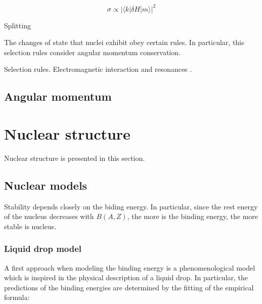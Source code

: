 \documentclass[openany]{book}
\begin{document}
\begin{equation} \label{eq:crossSection_perturbation}
	\sigma \propto |\langle k | \delta H|m \rangle|^2
\end{equation}

Splitting 




The changes of state that nuclei exhibit obey certain rules. In particular, this selection rules consider angular momentum conservation. 



Selection rules. Electromagnetic interaction and resonances \cite{sasaki_kawano_stetcu_2022}.

\subsection{Angular momentum}  \label{sub:quantumAngularMomentum}

\section{Nuclear structure} \label{sec:nuclearStructure}

Nuclear structure is presented in this section.

\subsection{Nuclear models}  \label{sub:nuclearModels}

Stability depends closely on the biding energy. In particular, since the rest energy of the nucleus decreases with $B(A, Z)$, the more is the binding energy, the more stable is nucleus.

\subsubsection{Liquid drop model} \label{ssub:liquidDropModel}

A first approach when modeling the binding energy is a phenomenological model which is inspired in the physical description of a liquid drop. In particular, the predictions of the binding energies are determined by the fitting of the empirical formula: \\ 
\end{document}
